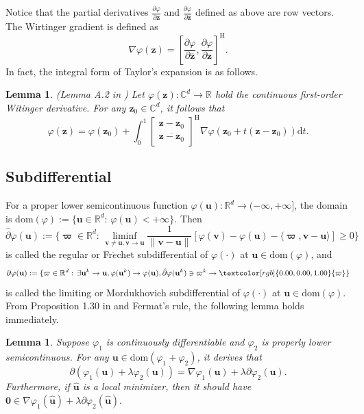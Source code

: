 \documentclass{article}
\newtheorem{lemma}[theorem]{Lemma}
\numberwithin{equation}{section}
\begin{document}
Notice that the partial derivatives $\frac{\partial \varphi}{\partial\mathbf{z}}$ and $\frac{\partial \varphi}{\partial\overline{\mathbf{z}}}$ defined as above are row vectors. The Wirtinger gradient is defined as
$$\nabla\varphi(\mathbf{z})=[\frac{\partial \varphi}{\partial\overline{\mathbf{z}}}, \frac{\partial \varphi}{\partial\mathbf{z}}]^\mathrm{H}.$$
In fact, the integral form of Taylor's expansion is as follows.
\begin{lemma}\label{mvt-com}(Lemma A.2 in \cite{sun2018geometric})
	Let $\varphi(\mathbf{z}): \mathbb{C}^d\to\mathbb{R}$ hold the continuous first-order Witinger derivative. For any  $\mathbf{z}_0\in\mathbb{C}^d$, it follows that
	$$\varphi(\mathbf{z})=\varphi(\mathbf{z}_0)+\int_0^1\begin{bmatrix} \mathbf{z}-\mathbf{z}_0\\
		\overline{\mathbf{z}-\mathbf{z}_0} \end{bmatrix}^\mathrm{H}\nabla\varphi(\mathbf{z}_0+t(\mathbf{z}-\mathbf{z}_0))\mathrm{d}t.$$
\end{lemma}

\subsection{Subdifferential}
For a proper lower semicontinuous function $\varphi(\mathbf{u}): \mathbb{R}^d\to(-\infty, +\infty]$, the domain is 
$\mathrm{dom}(\varphi):=\{\mathbf{u}\in\mathbb{R}^d: \,\varphi(\mathbf{u})<+\infty\}.$
Then
$$\hat{\partial}\varphi(\mathbf{u}):=\{\mathbf{\varpi}\in\mathbb{R}^d: \,\liminf_{\mathbf{v}\neq\mathbf{u}, \mathbf{v}\to\mathbf{u}}\frac{1}{\|\mathbf{v}-\mathbf{u}\|}[\varphi(\mathbf{v})-\varphi(\mathbf{u})
-\langle\mathbf{\varpi},\mathbf{v}-\mathbf{u}\rangle]\geq0\}$$
is called the regular or Fr$\acute{e}$chet subdifferential of $\varphi(\cdot)$ at $\mathbf{u}\in\mathrm{dom}(\varphi)$, and
$$\partial\varphi(\mathbf{u}):=\{\mathbf{\varpi}\in\mathbb{R}^d: \,\exists \mathbf{u}^k\to\mathbf{u}, \varphi(\mathbf{u}^k)\to\varphi(\mathbf{u}), 
\hat{\partial}\varphi(\mathbf{u}^k)\ni\mathbf{\varpi}^k\to \textcolor[rgb]{0.00,0.00,1.00}{\mathbf{\varpi}}\}$$
is called the limiting or Mordukhovich subdifferential of $\varphi(\cdot)$ at $\mathbf{u}\in\mathrm{dom}(\varphi)$.
From Proposition 1.30 in \cite{mordukhovich2018variational} and Fermat's rule, the following lemma holds immediately.
\begin{lemma}\label{opt-diff}
Suppose $\varphi_1$ is continuously differentiable and $\varphi_2$ is properly lower semicontinuous. For any $\mathbf{u}\in\mathrm{dom}(\varphi_1+\varphi_2)$, it derives that
	\begin{equation}\label{diff-sumrule}
		\partial(\varphi_1(\mathbf{u})+\lambda\varphi_2(\mathbf{u}))=\nabla \varphi_1(\mathbf{u})+\lambda\partial\varphi_2(\mathbf{u}).\nonumber
	\end{equation}
	Furthermore, if $\hat{\mathbf{u}}$ is a local minimizer, then it should have $\mathbf{0}\in\nabla \varphi_1(\hat{\mathbf{u}})+\lambda\partial\varphi_2(\hat{\mathbf{u}}).$
\end{lemma}
\end{document}
